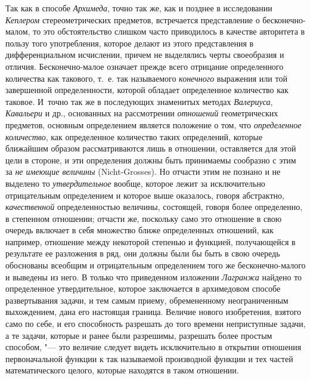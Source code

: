 Так как в способе {\em Архимеда}, точно так же, как и
позднее в исследовании {\em Кеплером} стереометрических
предметов, встречается представление о бесконечно-малом, то это
обстоятельство слишком часто приводилось в качестве авторитета в пользу
того употребления, которое делают из этого представления в дифференциальном
исчислении, причем не выделялись черты своеобразия и отличия.
Бесконечно-малое означает прежде всего отрицание определенного количества
как такового, т.~е. так называемого {\em конечного}
выражения или той завершенной определенности, которой обладает определенное
количество как таковое. И~точно так же в последующих знаменитых методах
{\em Валериуса}, {\em Кавальери} и
др., основанных на рассмотрении {\em отношений}
геометрических предметов, основным определением является положение о том,
что {\em определенное количество}, как определенное
количество таких определений, которые ближайшим образом рассматриваются
лишь в отношении, оставляется для этой цели в стороне, и эти определения
должны быть принимаемы сообразно с этим за {\em не
имеющие величины} (Nicht-Grosses). Но отчасти этим не познано и не выделено
то {\em утвердительное} вообще, которое лежит за
исключительно отрицательным определением и которое выше оказалось, говоря
абстрактно, {\em качественной} определенностью
величины, состоящей, говоря более определенно, в степенном отношении;
отчасти же, поскольку само это отношение в свою очередь включает в себя
множество ближе определенных отношений, как например, отношение между
некоторой степенью и функцией, получающейся в результате ее разложения в
ряд, они должны были бы быть в свою очередь обоснованы всеобщим и
отрицательным определением того же бесконечно-малого и выведены из него. В
только что приведенном изложении {\em Лагранжа} найдено
то определенное утвердительное, которое заключается в архимедовом способе
развертывания задачи, и тем самым приему, обремененному неограниченным
выхождением, дана его настоящая граница. Величие нового изобретения,
взятого само по себе, и его способность разрешать до того времени
неприступные задачи, а те задачи, которые и ранее были разрешимы, разрешать
более простым способом, "--- это величие следует видеть исключительно в
открытии отношения первоначальной функции к так называемой производной
функции и тех частей математического целого, которые находятся в таком
отношении.

